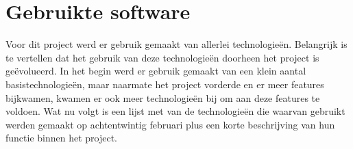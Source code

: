 \documentclass[a4paper,11pt]{article}
\begin{document}
\section{Gebruikte software}
%
%
%

Voor dit project werd er gebruik gemaakt van allerlei technologieën. Belangrijk is te vertellen dat het gebruik van deze technologieën doorheen het project is geëvolueerd. In het begin werd er gebruik gemaakt van een klein aantal basistechnologieën, maar naarmate het project vorderde en er meer features bijkwamen, kwamen er ook meer technologieën bij om aan deze features te voldoen. Wat nu volgt is een lijst met van de technologieën die waarvan gebruikt werden gemaakt op achtentwintig februari plus een korte beschrijving van hun functie binnen het project.
\end{document}
